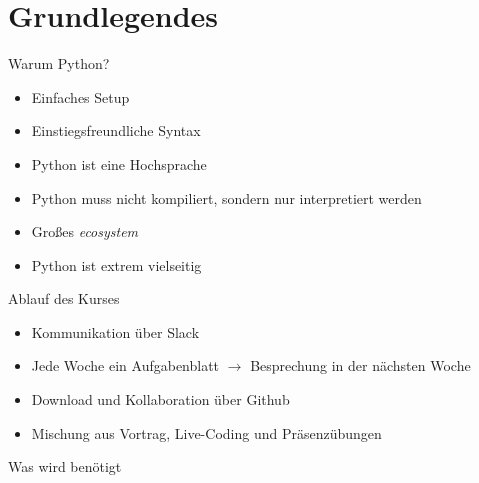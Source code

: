 \documentclass[algorithm,pgfplots,colortheme=dark]{cuzbeamer}
\begin{document}

\maketitle

\section{Grundlegendes}

\begin{frame}
\begin{block}{Warum Python?}
	\begin{itemize}
	\item Einfaches Setup
	\item Einstiegsfreundliche Syntax
	\item Python ist eine Hochsprache
	\item Python muss nicht kompiliert, sondern nur interpretiert werden
	\item Großes \textit{ecosystem}
	\item Python ist extrem vielseitig
	\end{itemize}
\end{block}
\end{frame}

\begin{frame}

\begin{block}{Ablauf des Kurses}
	\begin{itemize}
	\item Kommunikation über Slack 
	\item Jede Woche ein Aufgabenblatt $\rightarrow$ Besprechung in der nächsten Woche
	\item Download und Kollaboration über Github
	\item Mischung aus Vortrag, Live-Coding und Präsenzübungen
	\end{itemize}
\end{block}
\end{frame}

\begin{frame}{Was wird benötigt}
\end{frame}
\end{document}
